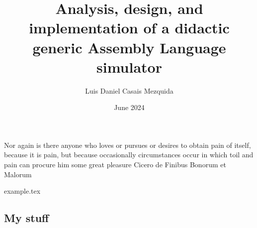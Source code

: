 \documentclass[en]{uc3mthesisIEEE}
\title{Analysis, design, and implementation of a didactic generic Assembly Language simulator}
\author{Luis Daniel Casais Mezquida}
\date{June 2024}
\begin{document}
  \makecover

  \makeepigraph
    {Nor again is there anyone who loves or pursues or desires to obtain pain of itself, because it is pain, but because occasionally circumstances occur in which toil and pain can procure him some great pleasure}  %
    {Cicero}  %
    {de Finibus Bonorum et Malorum}  %


  \begin{abstract}
    \lipsum[1-3]
  \end{abstract}


  \begin{acknowledgements}
    \lipsum[1]
  \end{acknowledgements}


  \tableofcontents
  \listoffigures
  \listoftables


  \begin{thesis}
    \newpage
    {example.tex}
  \end{thesis}

  \cleardoublepage
  \printbibliography[heading=bibintoc]

  \cleardoublepage
	\printglossaries


  \begin{appendices}
    \chapter{My stuff}
    \lipsum
  \end{appendices}
\end{document}

